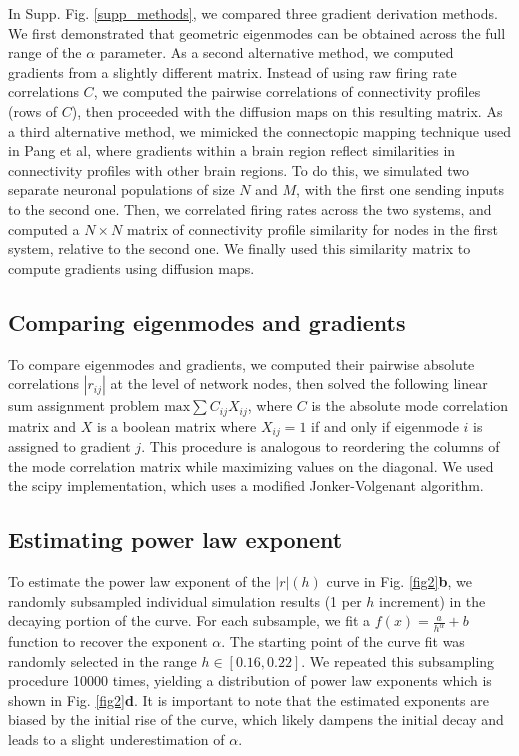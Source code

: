 \documentclass{article}
\begin{document}
In Supp. Fig. \ref{supp_methods}, we compared three gradient derivation methods. We first demonstrated that geometric eigenmodes can be obtained across the full range of the $\alpha$ parameter. As a second alternative method, we computed gradients from a slightly different matrix. Instead of using raw firing rate correlations $C$, we computed the pairwise correlations of connectivity profiles (rows of $C$), then proceeded with the diffusion maps on this resulting matrix. As a third alternative method, we mimicked the connectopic mapping technique\cite{haak2018connectopic} used in Pang et al\cite{pang2023geometric}, where gradients within a brain region reflect similarities in connectivity profiles with other brain regions. To do this, we simulated two separate neuronal populations of size $N$ and $M$, with the first one sending inputs to the second one. Then, we correlated firing rates across the two systems, and computed a $N\times N$ matrix of connectivity profile similarity for nodes in the first system, relative to the second one. We finally used this similarity matrix to compute gradients using diffusion maps. 

\subsection*{Comparing eigenmodes and gradients}

To compare eigenmodes and gradients, we computed their pairwise absolute correlations $|r_{ij}|$ at the level of network nodes, then solved the following linear sum assignment problem $\text{max}\sum C_{ij}X_{ij}$, where $C$ is the absolute mode correlation matrix and $X$ is a boolean matrix where $X_{ij}=1$ if and only if eigenmode $i$ is assigned to gradient $j$. This procedure is analogous to reordering the columns of the mode correlation matrix while maximizing values on the diagonal. We used the scipy implementation\cite{virtanen2020scipy}, which uses a modified Jonker-Volgenant algorithm\cite{jonker1988shortest}. 

\subsection*{Estimating power law exponent}

To estimate the power law exponent of the $|r|(h)$ curve in Fig. \ref{fig2}\textbf{b}, we randomly subsampled individual simulation results (1 per $h$ increment) in the decaying portion of the curve. For each subsample, we fit a $f(x)=\frac{a}{h^\alpha}+b$ function to recover the exponent $\alpha$. The starting point of the curve fit was randomly selected in the range $h\in[0.16, 0.22]$. We repeated this subsampling procedure 10000 times, yielding a distribution of power law exponents which is shown in Fig. \ref{fig2}\textbf{d}. It is important to note that the estimated exponents are biased by the initial rise of the curve, which likely dampens the initial decay and leads to a slight underestimation of $\alpha$.
\end{document}
